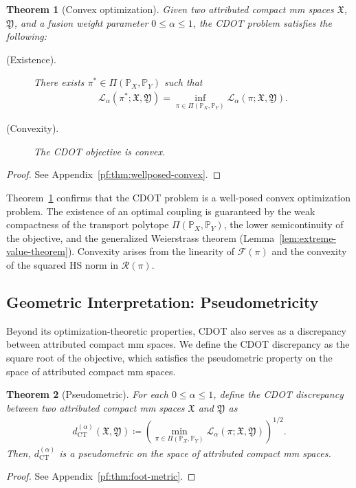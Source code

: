 \documentclass{article}
\theoremstyle{plain}
\newtheorem{theorem}{Theorem}[section]
\theoremstyle{definition}
\theoremstyle{remark}
\begin{document}
\begin{theorem}[Convex optimization]
	\label{thm:wellposed-convex}
	Given two attributed compact mm spaces $\mathfrak{X}$, $\mathfrak{Y}$, and a fusion weight parameter $0 \leq \alpha \leq 1$, the CDOT problem satisfies the following:
	\begin{description}
		\item[(Existence).] There exists $\pi^* \in \Pi(\mathbb{P}_X,\mathbb{P}_Y)$ such that
		\begin{align*}
			\mathcal{L}_{\alpha}(\pi^*; \mathfrak{X}, \mathfrak{Y}) = \inf_{\pi \in \Pi(\mathbb{P}_X,\mathbb{P}_Y)} \mathcal{L}_{\alpha}(\pi; \mathfrak{X},\mathfrak{Y}) .
		\end{align*}
		\item[(Convexity).] The CDOT objective is convex.
	\end{description}
\end{theorem}
\begin{proof}
	See Appendix~\ref{pf:thm:wellposed-convex}.
\end{proof}

Theorem~\ref{thm:wellposed-convex} confirms that the CDOT problem is a well-posed convex optimization problem. The existence of an optimal coupling is guaranteed by the weak compactness of the transport polytope $\Pi(\mathbb{P}_X,\mathbb{P}_Y)$, the lower semicontinuity of the objective, and the generalized Weierstrass theorem (Lemma~\ref{lem:extreme-value-theorem}). Convexity arises from the linearity of $\mathcal{F}(\pi)$ and the convexity of the squared HS norm in $\mathcal{R}(\pi)$.

\subsection{Geometric Interpretation: Pseudometricity}

Beyond its optimization-theoretic properties, CDOT also serves as a discrepancy between attributed compact mm spaces. We define the CDOT discrepancy as the square root of the objective, which satisfies the pseudometric property on the space of attributed compact mm spaces.

\begin{theorem}[Pseudometric]
	\label{thm:foot-metric}
	For each $0 \leq \alpha \leq 1$, define the CDOT discrepancy between two attributed compact mm spaces $\mathfrak{X}$ and $\mathfrak{Y}$ as
	\begin{align*}
		d_{\mathrm{CT}}^{(\alpha)}(\mathfrak{X}, \mathfrak{Y}) \coloneqq \left( \min_{\pi \in \Pi(\mathbb{P}_X,\mathbb{P}_Y)} \mathcal{L}_{\alpha}(\pi; \mathfrak{X},\mathfrak{Y}) \right)^{1/2}.
	\end{align*}
	Then, $d_{\mathrm{CT}}^{(\alpha)}$ is a pseudometric on the space of attributed compact mm spaces.
\end{theorem}
\begin{proof}
	See Appendix~\ref{pf:thm:foot-metric}.
\end{proof}
\end{document}
